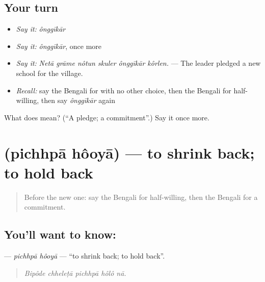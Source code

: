 \subsection*{Your turn}
\begin{itemize}
\raggedright
  \item \emph{Say it:} \emph{ônggīkār}
  \item \emph{Say it:} \emph{ônggīkār}, once more
  \item \emph{Say it:} \emph{Netā grāme nôtun skuler ônggīkār kôrlen.} — The leader pledged a new school for the village.
  \item \emph{Recall:} say the Bengali for with no other choice, then the Bengali for half-willing, then say \emph{ônggīkār} again
\end{itemize}

\begin{tcolorbox}[breakable,colback=teal!4,colframe=teal!35!black,title={Before you move on}]
What does  mean? (\textquotedblleft{}A pledge; a commitment\textquotedblright{}.) Say it once more.
\end{tcolorbox}
\section[\texorpdfstring{\bn{পিছপা} \bn{হওয়া} (pichhpā hôoyā)}{পিছপা হওয়া (pichhpā hôoyā)}]{  (pichhpā hôoyā) — to shrink back; to hold back}

\label{lesson:BN-C537-pichhpa-hooya}



\begin{quote}
Before the new one: say the Bengali for half-willing, then the Bengali for a commitment.
\end{quote}

\subsection*{You'll want to know:  }
\textbf{ } — \emph{pichhpā hôoyā} — \textquotedblleft{}to shrink back; to hold back\textquotedblright{}.

\begin{quote}
    
\end{quote}

\begin{quote}
\emph{Bipôde chheleṭā pichhpā hôlô nā.}
\end{quote}


